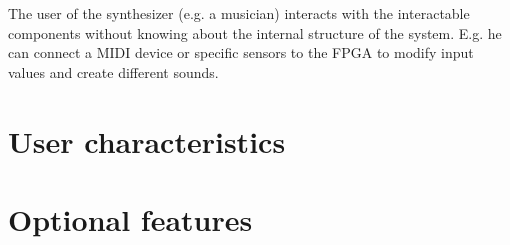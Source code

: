 The user of the synthesizer (e.g. a musician) interacts with the interactable components without knowing about the internal structure of the system. E.g. he can connect a MIDI device or specific sensors to the FPGA to modify input values and create different sounds. 
	\section{User characteristics}
	\section{Optional features}